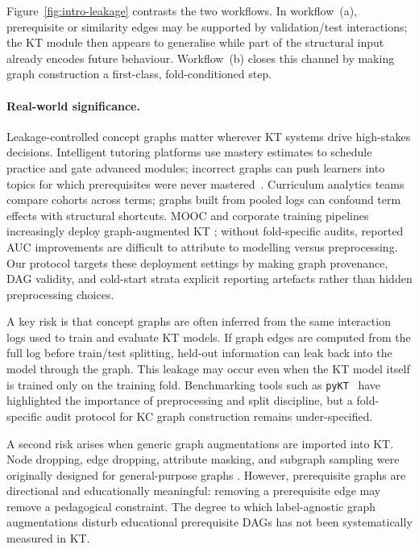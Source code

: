 \documentclass[runningheads]{llncs}
\begin{document}
Figure~\ref{fig:intro-leakage} contrasts the two workflows. In
workflow~(a), prerequisite or similarity edges may be supported by
validation/test interactions; the KT module then appears to generalise
while part of the structural input already encodes future behaviour.
Workflow~(b) closes this channel by making graph construction a
first-class, fold-conditioned step.

\paragraph{Real-world significance.}
Leakage-controlled concept graphs matter wherever KT systems drive
high-stakes decisions. Intelligent tutoring platforms use mastery
estimates to schedule practice and gate advanced modules; incorrect
graphs can push learners into topics for which prerequisites were never
mastered~\cite{heffernan2006assist,junyi_dataset}. Curriculum analytics
teams compare cohorts across terms; graphs built from pooled logs can
confound term effects with structural shortcuts. MOOC and corporate
training pipelines increasingly deploy graph-augmented KT
\cite{choi2020ednet,xes3g5m2023}; without fold-specific audits,
reported AUC improvements are difficult to attribute to modelling
versus preprocessing. Our protocol targets these deployment settings by
making graph provenance, DAG validity, and cold-start strata explicit
reporting artefacts rather than hidden preprocessing choices.

A key risk is that concept graphs are often inferred from the same
interaction logs used to train and evaluate KT models. If graph edges
are computed from the full log before train/test splitting, held-out
information can leak back into the model through the graph. This leakage
may occur even when the KT model itself is trained only on the training
fold. Benchmarking tools such as \texttt{pyKT}~\cite{liu2022pykt} have
highlighted the importance of preprocessing and split discipline, but a
fold-specific audit protocol for KC graph construction remains
under-specified.

A second risk arises when generic graph augmentations are imported into
KT. Node dropping, edge dropping, attribute masking, and subgraph
sampling were originally designed for general-purpose graphs
\cite{you2020graphcl,zhu2021gca,xia2022simgrace,thakoor2021bgrl,velickovic2018dgi,hassani2020mvgrl}. However, prerequisite graphs are
directional and educationally meaningful: removing a prerequisite edge
may remove a pedagogical constraint. The degree to which label-agnostic
graph augmentations disturb educational prerequisite DAGs has not been
systematically measured in KT.
\end{document}
